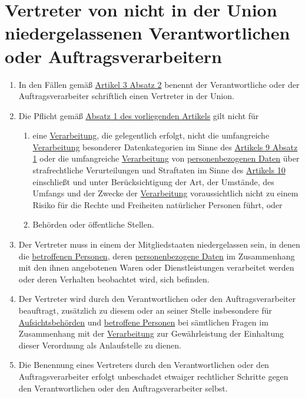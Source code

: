 \chapter{Vertreter von nicht in der Union niedergelassenen Verantwortlichen oder Auftragsverarbeitern}
\label{ch:27}


\begin{enumerate}

  \item In den Fällen gemäß \hyperref[itm:03-2]{Artikel 3 Absatz 2} benennt der Verantwortliche oder der
   Auftragsverarbeiter schriftlich einen Vertreter in der Union.
  \label{itm:27-1}

  \item Die Pflicht gemäß \hyperref[itm:27-1]{Absatz 1 des vorliegenden Artikels} gilt nicht für
  \label{itm:27-2}

  \begin{enumerate}
  
    \item eine \hyperref[itm:04-2]{Verarbeitung}, die gelegentlich erfolgt, nicht die umfangreiche \hyperref[itm:04-2]{Verarbeitung} besonderer Datenkategorien im
     Sinne des \hyperref[itm:09-1]{Artikels 9 Absatz 1} oder die umfangreiche \hyperref[itm:04-2]{Verarbeitung} von \hyperref[itm:04-1]{personenbezogenen Daten}
     über strafrechtliche Verurteilungen und Straftaten im Sinne des \hyperref[ch:10]{Artikels 10} einschließt und
     unter Berücksichtigung der Art, der Umstände, des Umfangs und der Zwecke der \hyperref[itm:04-2]{Verarbeitung} voraussichtlich nicht zu
     einem Risiko für die Rechte und Freiheiten natürlicher Personen führt, oder
    \label{itm:27-2a}

    \item Behörden oder öffentliche Stellen.
    \label{itm:27-2b}

  \end{enumerate}

  \item Der Vertreter muss in einem der Mitgliedstaaten niedergelassen sein, in denen die \hyperref[itm:04-1]{betroffenen Personen}, deren
   \hyperref[itm:04-1]{personenbezogene Daten} im Zusammenhang mit den ihnen angebotenen Waren oder Dienstleistungen verarbeitet werden oder
   deren Verhalten beobachtet wird, sich befinden.
  \label{itm:27-3}

  \item Der Vertreter wird durch den Verantwortlichen oder den Auftragsverarbeiter beauftragt, zusätzlich zu diesem oder
   an seiner Stelle insbesondere für \hyperref[itm:04-21]{Aufsichtsbehörden} und \hyperref[itm:04-1]{betroffene Personen} bei sämtlichen Fragen im Zusammenhang
   mit der \hyperref[itm:04-2]{Verarbeitung} zur Gewährleistung der Einhaltung dieser Verordnung als Anlaufstelle zu dienen.
  \label{itm:27-4}

  \item Die Benennung eines Vertreters durch den Verantwortlichen oder den Auftragsverarbeiter erfolgt unbeschadet
   etwaiger rechtlicher Schritte gegen den Verantwortlichen oder den Auftragsverarbeiter selbst.
  \label{itm:27-5}

\end{enumerate}


